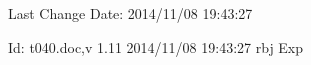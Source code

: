 Last Change $ $Date: 2014/11/08 19:43:27 $ $

$ $Id: t040.doc,v 1.11 2014/11/08 19:43:27 rbj Exp $ $
